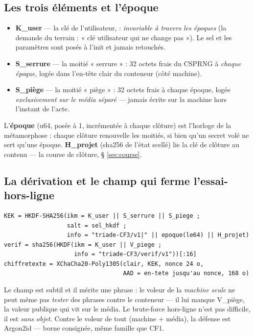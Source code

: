 \subsection{Les trois éléments et l'époque}

\begin{itemize}
\item \textbf{K\_user} — la clé de l'utilisateur,  : \emph{invariable à travers les époques} (la demande du terrain : « clé
utilisateur qui ne change pas »). Le sel et les paramètres sont posés à l'init et
jamais retouchés.
\item \textbf{S\_serrure} — la moitié « serrure » : 32 octets frais du CSPRNG à
\emph{chaque époque}, logée dans l'en-tête clair du conteneur (côté machine).
\item \textbf{S\_piège} — la moitié « piège » : 32 octets frais à chaque époque,
logée \emph{exclusivement sur le média séparé} — jamais écrite sur la machine hors
l'instant de l'acte.
\end{itemize}

L'\textbf{époque} (u64, posée à 1, incrémentée à chaque clôture) est l'horloge de la
métamorphose : chaque clôture renouvelle les moitiés, si bien qu'un secret volé ne
sert qu'une époque. \textbf{H\_projet} (sha256 de l'état scellé) lie la clé de clôture
au contenu — la course de clôture, § \ref{sec:course}.

\subsection{La dérivation et le champ qui ferme l'essai-hors-ligne}

\begin{lstlisting}
KEK = HKDF-SHA256(ikm = K_user || S_serrure || S_piege ;
                  salt = sel_hkdf ;
                  info = "triade-CF3/v1|" || epoque(le64) || H_projet)
verif = sha256(HKDF(ikm = K_user || V_piege ;
                    info = "triade-CF3/verif/v1"))[:16]
chiffretexte = XChaCha20-Poly1305(clair, KEK, nonce 24 o,
                                  AAD = en-tete jusqu'au nonce, 168 o)
\end{lstlisting}

Le champ  est subtil et il mérite une phrase : le voleur de la
\emph{machine seule} ne peut même pas \emph{tester} des phrases contre le conteneur —
il lui manque V\_piège, la valeur publique qui vit sur le média. Le brute-force
hors-ligne n'est pas difficile, il est \emph{sans objet}. Contre le voleur de tout
(machine + média), la défense est Argon2id — borne consignée, même famille que CF1.

